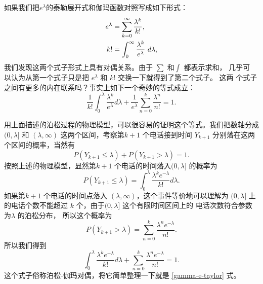 {如果我们把$e^\lambda$的泰勒展开式和伽玛函数对照写成如下形式：
\begin{align}
e^\lambda & =  \sum_{k=0}^{\infty} {\lambda^k \over k!} , \\
k! & =  \int_0^{\infty} {\lambda^k \over e^\lambda}\ d\lambda ,
\end{align}
我们发现这两个式子形式上具有对偶关系。由于 $\sum$ 和$\int$ 都表示求和， 几乎可
以认为从第一个式子只是把 $e^\lambda$ 和 $k!$ 交换一下就得到了第二个式子。 这两
个式子之间有更多的内在联系吗？事实上如下一个奇妙的等式成立：
\begin{equation}
\label{gamma-e-taylor}
\frac{1}{k!} \int_0^\lambda \frac{\lambda^k}{e^\lambda} d\lambda 
+ \frac{1}{e^\lambda} \sum_{n=0}^k \frac{\lambda^n}{n!} = 1 .
\end{equation}

用上面描述的泊松过程的物理模型，可以很容易的证明这个等式。我们把数轴分成
$(0, \lambda]$ 和 $(\lambda, \infty)$ 这两个区间，考察第$k+1$ 个电话接到时间
$Y_{k+1}$ 分别落在这两个区间的概率，当然有
$$ P(Y_{k+1} \le \lambda) + P(Y_{k+1} > \lambda)  = 1 .$$
按照上述的物理模型，显然第$k+1$ 个电话的时间落入$(0, \lambda]$ 的概率为
$$ P(Y_{k+1} \le \lambda) = \int_0^\lambda \frac{\lambda^k e^{-\lambda}}{k!}  d \lambda .$$
如果第$k+1$ 个电话的时间点落入 $(\lambda, \infty)$，这个事件等价地可以理解为 $(0,
\lambda]$ 上的电话个数不能超过 $k$ 个，由于$(0, \lambda]$ 这个有限时间区间上的
电话次数符合参数为$\lambda$ 的泊松分布， 所以这个概率为
$$  P(Y_{k+1} > \lambda) = \sum_{n=0}^k \frac{\lambda^n e^{-\lambda} }{n!} .$$
所以我们得到
\begin{equation}
\label{poisson-gamma-dual}
\int_0^\lambda \frac{\lambda^k e^{-\lambda}}{k!}d\lambda 
+ \sum_{n=0}^k \frac{\lambda^n e^{-\lambda}}{n!} = 1 .
\end{equation}
这个式子俗称泊松-伽玛对偶，将它简单整理一下就是 \eqref{gamma-e-taylor} 式。

}
